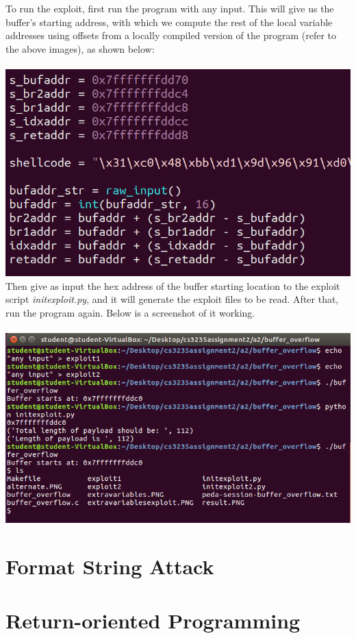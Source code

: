 \documentclass[12pt]{article}
\begin{document}
To run the exploit, first run the program with any input. This will give us the buffer's starting address, with which we compute the rest of the local variable addresses using offsets from a locally compiled version of the program (refer to the above images), as shown below:\\\\
\includegraphics[scale=0.7]{./a2/buffer_overflow/offset.PNG}\\

Then give as input the hex address of the buffer starting location to the exploit script \emph{initexploit.py}, and it will generate the exploit files to be read. After that, run the program again. Below is a screenshot of it working.\\\\
\includegraphics[scale=1]{./a2/buffer_overflow/result.PNG}


\newpage
\section{Format String Attack}






\newpage
\section{Return-oriented Programming}
\end{document}
